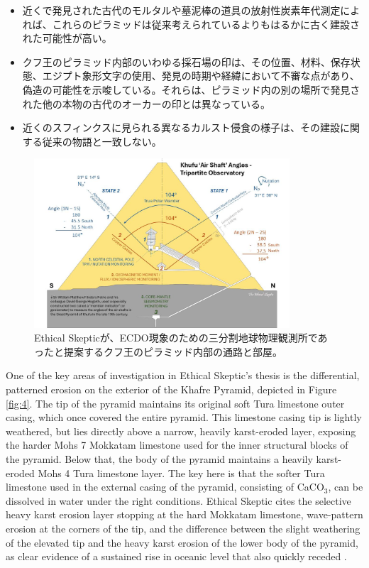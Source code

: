 \documentclass[10pt,twocolumn,letterpaper]{article}
\begin{document}
\begin{flushleft}
\begin{itemize}
    \item 近くで発見された古代のモルタルや墓泥棒の道具の放射性炭素年代測定によれば、これらのピラミッドは従来考えられているよりもはるかに古く建設された可能性が高い。
    \item クフ王のピラミッド内部のいわゆる採石場の印は、その位置、材料、保存状態、エジプト象形文字の使用、発見の時期や経緯において不審な点があり、偽造の可能性を示唆している。それらは、ピラミッド内の別の場所で発見された他の本物の古代のオーカーの印とは異なっている。
    \item 近くのスフィンクスに見られる異なるカルスト侵食の様子は、その建設に関する従来の物語と一致しない。
\end{itemize}
\end{flushleft}

\begin{figure}[b]
\begin{center}
\includegraphics[width=0.85\textwidth]{shafts.jpg}
\end{center}
   \caption{Ethical Skepticが、ECDO現象のための三分割地球物理観測所であったと提案するクフ王のピラミッド内部の通路と部屋\cite{28}。}
\label{fig:5}
\end{figure}
One of the key areas of investigation in Ethical Skeptic's thesis is the differential, patterned erosion on the exterior of the Khafre Pyramid, depicted in Figure \ref{fig:4}. The tip of the pyramid maintains its original soft Tura limestone outer casing, which once covered the entire pyramid. This limestone casing tip is lightly weathered, but lies directly above a narrow, heavily karst-eroded layer, exposing the harder Mohs 7 Mokkatam limestone used for the inner structural blocks of the pyramid. Below that, the body of the pyramid maintains a heavily karst-eroded Mohs 4 Tura limestone layer. The key here is that the softer Tura limestone used in the external casing of the pyramid, consisting of CaCO$_3$, can be dissolved in water under the right conditions. Ethical Skeptic cites the selective heavy karst erosion layer stopping at the hard Mokkatam limestone, wave-pattern erosion at the corners of the tip, and the difference between the slight weathering of the elevated tip and the heavy karst erosion of the lower body of the pyramid, as clear evidence of a sustained rise in oceanic level that also quickly receded \cite{27}.
\end{document}
